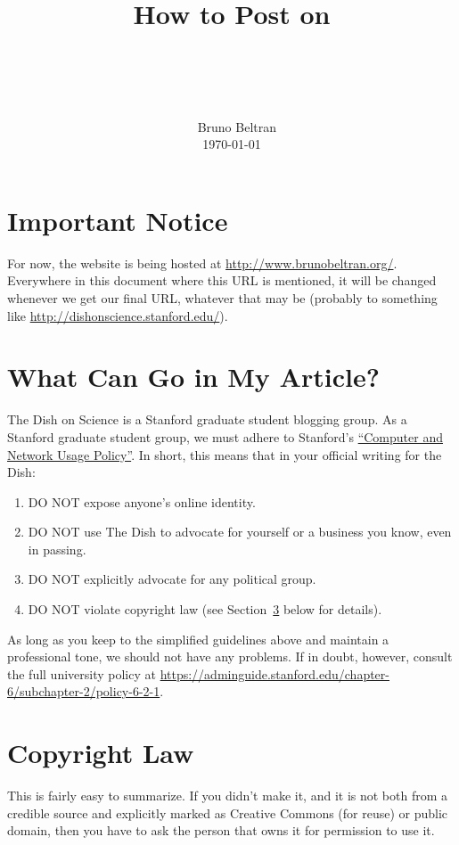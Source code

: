 \documentclass[paper=a4, fontsize=11pt]{scrartcl}
\title{\
        \usefont{OT1}{bch}{b}{n}
        \horrule{0.5pt} \\[0.4cm]
        \huge How to Post on \\ \dishurl{} \\
        \horrule{2pt} \\[0.5cm]
}
\author{\
        \normalfont{}                     \normalsize
        Bruno Beltran\\[-3pt]             \normalsize
        \today
}
\date{}
\numberwithin{equation}{section}        %
\numberwithin{figure}{section}            %
\numberwithin{table}{section}                %
\newcommand{\dishurl}[1]{\url{http://www.brunobeltran.org/#1}}
\begin{document}
\maketitle

\section{Important Notice}
For now, the website is being hosted at \dishurl{}. Everywhere in this document where this
URL is mentioned, it will be changed whenever we get our final URL, whatever
that may be (probably to something like
\url{http://dishonscience.stanford.edu/}).

\section{What Can Go in My Article?}
The Dish on Science is a Stanford graduate student blogging group.
As a Stanford graduate student group, we must adhere to Stanford's
\href{https://adminguide.stanford.edu/chapter-6/subchapter-2/policy-6-2-1}{``Computer
and Network Usage Policy''}. In short, this means that in your official writing
for the Dish:\@
\begin{enumerate}
    \item DO NOT expose anyone's online identity.
    \item DO NOT use The Dish to advocate for yourself or a business you know,
        even in passing.
    \item DO NOT explicitly advocate for any political group.
    \item DO NOT violate copyright law (see
        Section~\ref{sec:copyright} below for details).
\end{enumerate}

As long as you keep to the simplified guidelines above and maintain a
professional tone, we should not have any problems. If in doubt, however,
consult the full university policy at
\href{https://adminguide.stanford.edu/chapter-6/subchapter-2/policy-6-2-1}{https://adminguide.stanford.edu/chapter-6/subchapter-2/policy-6-2-1}.

\section{Copyright Law}\label{sec:copyright}

This is fairly easy to summarize. If you didn't make it, and it is not both from
a credible source and explicitly marked as Creative Commons (for reuse) or
public domain, then you have to ask the person that owns it for permission to
use it.
\end{document}
